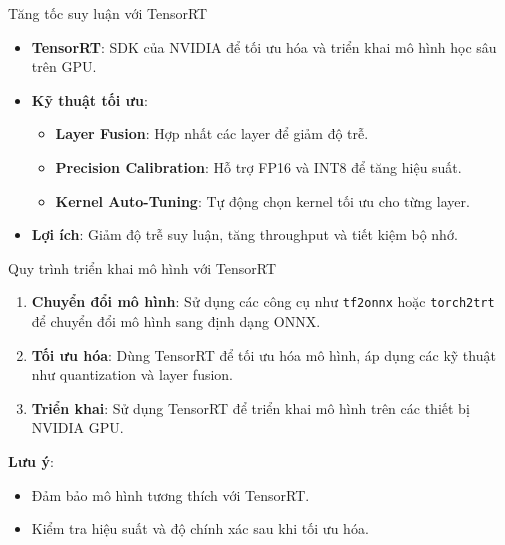 \documentclass{beamer}
\begin{document}
\begin{frame}{Tăng tốc suy luận với TensorRT}
    \begin{itemize}
        \item \textbf{TensorRT}: SDK của NVIDIA để tối ưu hóa và triển khai mô hình học sâu trên GPU.
        \item \textbf{Kỹ thuật tối ưu}:
        \begin{itemize}
            \item \textbf{Layer Fusion}: Hợp nhất các layer để giảm độ trễ.
            \item \textbf{Precision Calibration}: Hỗ trợ FP16 và INT8 để tăng hiệu suất.
            \item \textbf{Kernel Auto-Tuning}: Tự động chọn kernel tối ưu cho từng layer.
        \end{itemize}
        \item \textbf{Lợi ích}: Giảm độ trễ suy luận, tăng throughput và tiết kiệm bộ nhớ.
    \end{itemize}
\end{frame}

\begin{frame}{Quy trình triển khai mô hình với TensorRT}
    \begin{enumerate}
        \item \textbf{Chuyển đổi mô hình}: Sử dụng các công cụ như \texttt{tf2onnx} hoặc \texttt{torch2trt} để chuyển đổi mô hình sang định dạng ONNX.
        \item \textbf{Tối ưu hóa}: Dùng TensorRT để tối ưu hóa mô hình, áp dụng các kỹ thuật như quantization và layer fusion.
        \item \textbf{Triển khai}: Sử dụng TensorRT để triển khai mô hình trên các thiết bị NVIDIA GPU.
    \end{enumerate}
    \textbf{Lưu ý}:
    \begin{itemize}
        \item Đảm bảo mô hình tương thích với TensorRT.
        \item Kiểm tra hiệu suất và độ chính xác sau khi tối ưu hóa.
    \end{itemize}
\end{frame}
\end{document}
